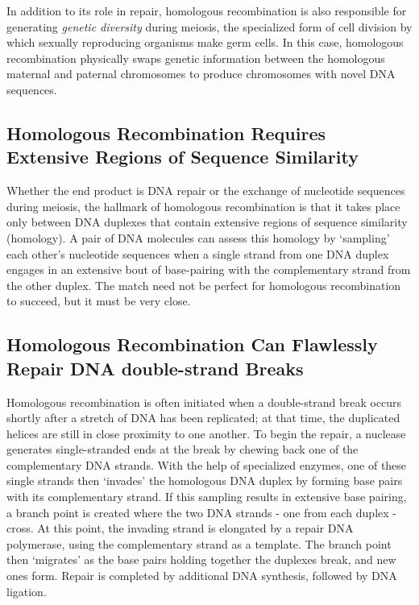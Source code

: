 In addition to its role in repair, homologous recombination is also responsible
for generating \textit{genetic diversity} during meiosis, the specialized form
of cell division by which sexually reproducing organisms make germ cells.
In this case, homologous recombination physically swaps genetic information
between the homologous maternal and paternal chromosomes to
produce chromosomes with novel DNA sequences.

\subsection{Homologous Recombination Requires Extensive Regions of Sequence Similarity}

Whether the end product is DNA repair or the exchange of nucleotide
sequences during meiosis, the hallmark of homologous recombination
is that it takes place only between DNA duplexes that contain extensive
regions of sequence similarity (homology). A pair of DNA molecules can
assess this homology by ‘sampling’ each other’s nucleotide sequences
when a single strand from one DNA duplex engages in an extensive bout
of base-pairing with the complementary strand from the other duplex.
The match need not be perfect for homologous recombination to succeed, but it must be very close.


\subsection{Homologous Recombination Can Flawlessly Repair DNA double-strand Breaks}

Homologous recombination is often initiated when a double-strand break
occurs shortly after a stretch of DNA has been replicated; at that time,
the duplicated helices are still in close proximity to one another.
To begin the repair, a nuclease generates single-stranded ends
at the break by chewing back one of the complementary DNA strands.
With the help of specialized enzymes, one of these single strands then ‘invades’
the homologous DNA duplex by forming base
pairs with its complementary strand. If this sampling results in extensive
base pairing, a branch point is created where the two DNA strands - one
from each duplex - cross. At this point, the invading strand
is elongated by a repair DNA polymerase, using the complementary
strand as a template. The branch point then ‘migrates’
as the base pairs holding together the duplexes break, and new ones
form. Repair is completed by additional DNA synthesis,
followed by DNA ligation. 

